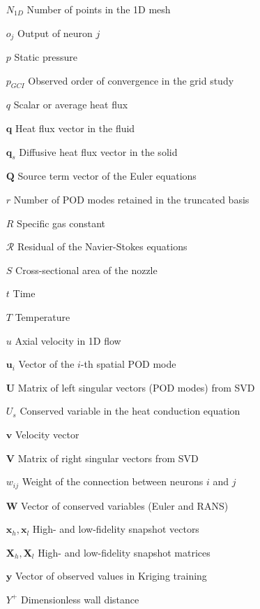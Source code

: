 \begin{itemize}
\item[$N_{1D}$] Number of points in the 1D mesh
\item[$o_j$] Output of neuron $j$
\item[$p$] Static pressure
\item[$p_{GCI}$] Observed order of convergence in the grid study
\item[$q$] Scalar or average heat flux
\item[$\mathbf{q}$] Heat flux vector in the fluid
\item[$\mathbf{q}_s$] Diffusive heat flux vector in the solid
\item[$\mathbf{Q}$] Source term vector of the Euler equations
\item[$r$] Number of POD modes retained in the truncated basis
\item[$R$] Specific gas constant
\item[$\mathcal{R}$] Residual of the Navier-Stokes equations
\item[$S$] Cross-sectional area of the nozzle
\item[$t$] Time
\item[$T$] Temperature
\item[$u$] Axial velocity in 1D flow
\item[$\mathbf{u}_i$] Vector of the $i$-th spatial POD mode
\item[$\mathbf{U}$] Matrix of left singular vectors (POD modes) from SVD
\item[$U_s$] Conserved variable in the heat conduction equation
\item[$\mathbf{v}$] Velocity vector
\item[$\mathbf{V}$] Matrix of right singular vectors from SVD
\item[$w_{ij}$] Weight of the connection between neurons $i$ and $j$
\item[$\mathbf{W}$] Vector of conserved variables (Euler and RANS)
\item[$\mathbf{x}_h, \mathbf{x}_l$] High- and low-fidelity snapshot vectors
\item[$\mathbf{X}_h, \mathbf{X}_l$] High- and low-fidelity snapshot matrices
\item[$\mathbf{y}$] Vector of observed values in Kriging training
\item[$Y^{+}$] Dimensionless wall distance
\end{itemize}

